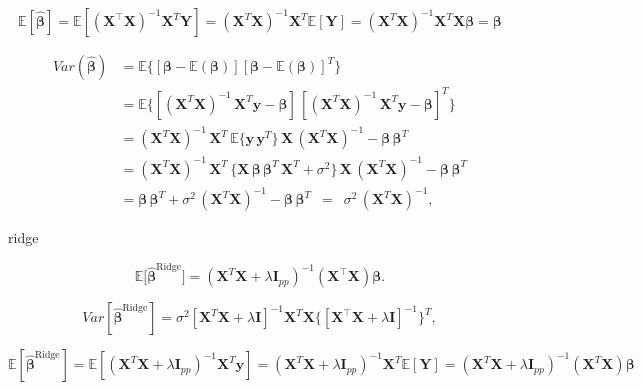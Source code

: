 \documentclass[twoside,11pt]{report}
\begin{document}
$$
\mathbb{E}[\mathbf{\hat{\beta}}] = \mathbb{E}[ (\mathbf{X}^{\top} \mathbf{X})^{-1}\mathbf{X}^{T} \mathbf{Y}]=(\mathbf{X}^{T} \mathbf{X})^{-1}\mathbf{X}^{T} \mathbb{E}[ \mathbf{Y}]=(\mathbf{X}^{T} \mathbf{X})^{-1} \mathbf{X}^{T}\mathbf{X}\mathbf{\beta}=\mathbf{\beta}
$$


\begin{align*}
Var(\mathbf{\hat{\beta}}) & = \mathbb{E} \{ [\mathbf{\beta} - \mathbb{E}(\mathbf{\beta})] [\mathbf{\beta} - \mathbb{E}(\mathbf{\beta})]^{T} \}
\\
& = \mathbb{E} \{ [(\mathbf{X}^{T} \mathbf{X})^{-1} \, \mathbf{X}^{T} \mathbf{y} - \mathbf{\beta}] \, [(\mathbf{X}^{T} \mathbf{X})^{-1} \, \mathbf{X}^{T} \mathbf{y} - \mathbf{\beta}]^{T} \}
\\
& = (\mathbf{X}^{T} \mathbf{X})^{-1} \, \mathbf{X}^{T} \, \mathbb{E} \{ \mathbf{y} \, \mathbf{y}^{T} \} \, \mathbf{X} \, (\mathbf{X}^{T} \mathbf{X})^{-1} - \mathbf{\beta} \, \mathbf{\beta}^{T}
\\
& = (\mathbf{X}^{T} \mathbf{X})^{-1} \, \mathbf{X}^{T} \, \{ \mathbf{X} \, \mathbf{\beta} \, \mathbf{\beta}^{T} \,  \mathbf{X}^{T} + \sigma^2 \} \, \mathbf{X} \, (\mathbf{X}^{T} \mathbf{X})^{-1} - \mathbf{\beta} \, \mathbf{\beta}^{T}
\\
& = \mathbf{\beta} \, \mathbf{\beta}^{T}  + \sigma^2 \, (\mathbf{X}^{T} \mathbf{X})^{-1} - \mathbf{\beta} \, \mathbf{\beta}^{T}
\, \, \, = \, \, \, \sigma^2 \, (\mathbf{X}^{T} \mathbf{X})^{-1},
\end{align*}



ridge


$$
\mathbb{E} \big[ \hat{\boldsymbol{\beta}}^{\mathrm{Ridge}} \big]=(\mathbf{X}^{T} \mathbf{X} + \lambda \mathbf{I}_{pp})^{-1} (\mathbf{X}^{\top} \mathbf{X})\boldsymbol{\beta}.
$$


$$
{Var}[\hat{\boldsymbol{\beta}}^{\mathrm{Ridge}}]=\sigma^2[  \mathbf{X}^{T} \mathbf{X} + \lambda \mathbf{I} ]^{-1}  \mathbf{X}^{T}\mathbf{X} \{ [  \mathbf{X}^{\top} \mathbf{X} + \lambda \mathbf{I} ]^{-1}\}^{T},
$$


$$
\mathbb{E}[\boldsymbol{\hat{\beta}}^{\mathrm{Ridge}}] = \mathbb{E}\left[ \left(\boldsymbol{X}^T\boldsymbol{X}+\lambda\boldsymbol{I}_{pp}\right)^{-1}\boldsymbol{X}^T\boldsymbol{y}\right]=\left(\boldsymbol{X}^T\boldsymbol{X}+\lambda\boldsymbol{I}_{pp}\right)^{-1}\boldsymbol{X}^T \mathbb{E}[ \mathbf{Y}]=\left(\boldsymbol{X}^T\boldsymbol{X}+\lambda\boldsymbol{I}_{pp}\right)^{-1}\left(\mathbf{X}^T  \mathbf{X}\right)\boldsymbol{\beta}
$$
\end{document}
